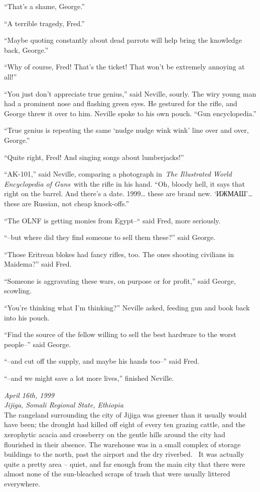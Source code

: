 ``That's a shame, George.''

``A terrible tragedy, Fred.''

``Maybe quoting constantly about dead parrots will help bring the
knowledge back, George.''

``Why of course, Fred! That's the ticket! That won't be extremely
annoying at all!''

``You just don't appreciate true genius,'' said Neville, sourly. The
wiry young man had a prominent nose and flashing green eyes. He gestured
for the rifle, and George threw it over to him. Neville spoke to his own
pouch. ``Gun encyclopedia.''

``True genius is repeating the same `nudge nudge wink wink' line over
and over, George.''

``Quite right, Fred! And singing songs about lumberjacks!''

``AK-101,'' said Neville, comparing a photograph in~\emph{The
Illustrated World Encyclopedia of Guns}~with the rifle in his hand.
``Oh, bloody hell, it says that right on the barrel. And there's a date.
1999\ldots{} these are brand new. `ИЖМАШ'\ldots{} these are Russian, not
cheap knock-offs.''

``The OLNF is getting monies from Egypt--`` said Fred, more seriously.

``--but where did they find someone to sell them these?'' said George.

``Those Eritrean blokes had fancy rifles, too. The ones shooting
civilians in Maidema?'' said Fred.

``Someone is aggravating these wars, on purpose or for profit,'' said
George, scowling.

``You're thinking what I'm thinking?'' Neville asked, feeding gun and
book back into his pouch.

``Find the source of the fellow willing to sell the best hardware to the
worst people--'' said George.

``--and cut off the supply, and maybe his hands too--'' said Fred.

``--and we might save a lot more lives,'' finished Neville.

\mybreak

\emph{April 16th, 1999}\\
\emph{Jijiga, Somali Regional State, Ethiopia}\\

The rangeland surrounding the city of Jijiga was greener than it usually
would have been; the drought had killed off eight of every ten grazing
cattle, and the xerophytic acacia and crossberry on the gentle hills
around the city had flourished in their absence. The warehouse was in a
small complex of storage buildings to the north, past the airport and
the dry riverbed. ~It was actually quite a pretty area -- quiet, and far
enough from the main city that there were almost none of the
sun-bleached scraps of trash that were usually littered everywhere.

